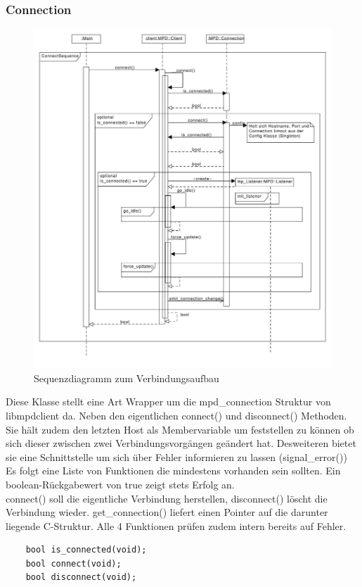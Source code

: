 \subsubsection{Connection}
\begin{figure}[htb!]
	\centering
        \includegraphics[scale=0.5]{ConnectSequence.pdf}
	\caption{Sequenzdiagramm zum Verbindungsaufbau}
	\label{seq_client_connect}
\end{figure}
Diese Klasse stellt eine Art Wrapper um die mpd\_connection Struktur von libmpdclient da.
Neben den eigentlichen connect() und disconnect() Methoden.
Sie hält zudem den letzten Host als Membervariable um feststellen zu können ob sich dieser zwischen 
zwei Verbindungsvorgängen geändert hat. Desweiteren bietet sie eine Schnittstelle um sich über Fehler informieren zu lassen (signal\_error())
\\
Es folgt eine Liste von Funktionen die mindestens vorhanden sein sollten.
Ein boolean-Rückgabewert von true zeigt stets Erfolg an.
\\
connect() soll die eigentliche Verbindung herstellen, disconnect() löscht die Verbindung wieder.
get\_connection() liefert einen Pointer auf die darunter liegende C-Struktur. Alle 4 Funktionen prüfen 
zudem intern bereits auf Fehler.
\begin{verbatim}
    bool is_connected(void);
    bool connect(void);
    bool disconnect(void);
\end{verbatim}

